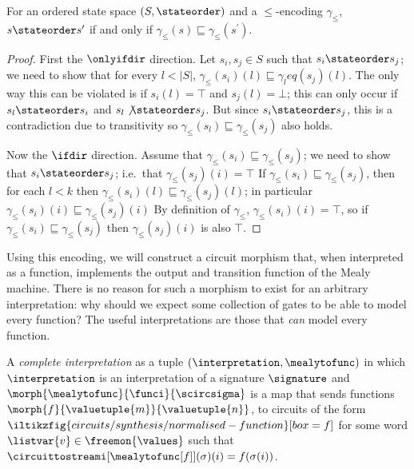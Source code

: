 \begin{lemma}
    For an ordered state space \((S,\stateorder)\) and a \(\leq\)-encoding
    \(\gamma_\leq\), \(s \stateorder s^\prime\) if and only if
    \(\gamma_\leq(s) \sqsubseteq \gamma_\leq(s^\prime)\).
\end{lemma}
\begin{proof}
    First the \(\onlyifdir\) direction.
    Let \(s_i, s_j \in S\) such that \(s_i \stateorder s_j\); we need to show
    that for every \(l < |S|\),
    \(\gamma_\leq(s_i)(l) \sqsubseteq \gamma_leq(s_j)(l)\).
    The only way this can be violated is if \(s_i(l) = \top\) and
    \(s_j(l) = \bot\); this can only occur if \(s_l \stateorder s_i\) and
    \(s_l \not\stateorder s_j\).
    But since \(s_i \stateorder s_j\), this is a contradiction due to
    transitivity so \(\gamma_\leq(s_l) \sqsubseteq \gamma_\leq(s_j)\) also
    holds.

    Now the \(\ifdir\) direction.
    Assume that \(\gamma_\leq(s_i) \sqsubseteq \gamma_\leq(s_j)\); we need to
    show that \(s_i \stateorder s_j\); i.e.\ that \(\gamma_\leq(s_j)(i) = \top\)
    If \(\gamma_\leq(s_i) \sqsubseteq \gamma_\leq(s_j)\), then for each
    \(l < k\) then \(\gamma_\leq(s_i)(l) \sqsubseteq \gamma_\leq(s_j)(l)\);
    in particular \(\gamma_\leq(s_i)(i) \sqsubseteq \gamma_\leq(s_j)(i)\)
    By definition of \(\gamma_\leq\), \(\gamma_\leq(s_i)(i) = \top\), so if
    \(\gamma_\leq(s_i) \sqsubseteq \gamma_\leq(s_j)\) then
    \(\gamma_\leq(s_j)(i)\) is also \(\top\).
\end{proof}

Using this encoding, we will construct a circuit morphism that,
when interpreted as a function, implements the output and transition function
of the Mealy machine.
There is no reason for such a morphism to exist for an arbitrary interpretation:
why should we expect some collection of gates to be able to model every
function?
The useful interpretations are those that \emph{can} model every function.

\begin{definition}\label{def:functional-completeness}
    A \emph{complete interpretation} as a tuple
    \((\interpretation,\mealytofunc)\) in which \(\interpretation\) is an
    interpretation of a signature \(\signature\) and \(
    \morph{\mealytofunc}{\funci}{\scircsigma}
    \) is a map that sends functions \(
    \morph{f}{\valuetuple{m}}{\valuetuple{n}}
    \), to circuits of the form \(
    \iltikzfig{circuits/synthesis/normalised-function}[box=f]
    \) for some word \(\listvar{v} \in \freemon{\values}\) such that
    \(\circuittostreami[\mealytofunc[f]](\sigma)(i) = f(\sigma(i))\).
\end{definition}

